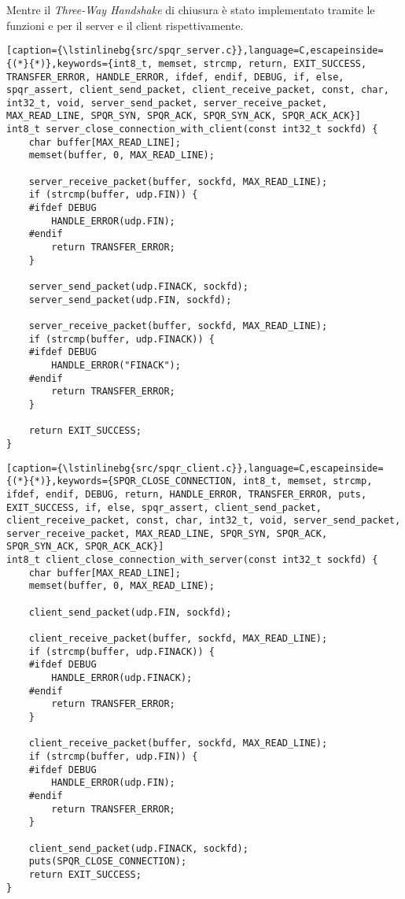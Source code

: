 Mentre il \textit{Three-Way Handshake} di chiusura è stato implementato tramite le funzioni  e  per il server e il client rispettivamente.

\begin{lstlisting}[caption={\lstinlinebg{src/spqr_server.c}},language=C,escapeinside={(*}{*)},keywords={int8_t, memset, strcmp, return, EXIT_SUCCESS, TRANSFER_ERROR, HANDLE_ERROR, ifdef, endif, DEBUG, if, else, spqr_assert, client_send_packet, client_receive_packet, const, char, int32_t, void, server_send_packet, server_receive_packet, MAX_READ_LINE, SPQR_SYN, SPQR_ACK, SPQR_SYN_ACK, SPQR_ACK_ACK}]
int8_t server_close_connection_with_client(const int32_t sockfd) {
    char buffer[MAX_READ_LINE];
    memset(buffer, 0, MAX_READ_LINE);

    server_receive_packet(buffer, sockfd, MAX_READ_LINE);
    if (strcmp(buffer, udp.FIN)) {
    #ifdef DEBUG
        HANDLE_ERROR(udp.FIN);
    #endif
        return TRANSFER_ERROR;
    }
    
    server_send_packet(udp.FINACK, sockfd);
    server_send_packet(udp.FIN, sockfd);
    
    server_receive_packet(buffer, sockfd, MAX_READ_LINE);
    if (strcmp(buffer, udp.FINACK)) {
    #ifdef DEBUG
        HANDLE_ERROR("FINACK");
    #endif
        return TRANSFER_ERROR;
    }

    return EXIT_SUCCESS;
}
\end{lstlisting}

\begin{lstlisting}[caption={\lstinlinebg{src/spqr_client.c}},language=C,escapeinside={(*}{*)},keywords={SPQR_CLOSE_CONNECTION, int8_t, memset, strcmp, ifdef, endif, DEBUG, return, HANDLE_ERROR, TRANSFER_ERROR, puts, EXIT_SUCCESS, if, else, spqr_assert, client_send_packet, client_receive_packet, const, char, int32_t, void, server_send_packet, server_receive_packet, MAX_READ_LINE, SPQR_SYN, SPQR_ACK, SPQR_SYN_ACK, SPQR_ACK_ACK}]
int8_t client_close_connection_with_server(const int32_t sockfd) {
    char buffer[MAX_READ_LINE];
    memset(buffer, 0, MAX_READ_LINE);

    client_send_packet(udp.FIN, sockfd);

    client_receive_packet(buffer, sockfd, MAX_READ_LINE);
    if (strcmp(buffer, udp.FINACK)) {
    #ifdef DEBUG
        HANDLE_ERROR(udp.FINACK);
    #endif
        return TRANSFER_ERROR;
    }

    client_receive_packet(buffer, sockfd, MAX_READ_LINE);
    if (strcmp(buffer, udp.FIN)) {
    #ifdef DEBUG
        HANDLE_ERROR(udp.FIN);
    #endif
        return TRANSFER_ERROR;
    }
    
    client_send_packet(udp.FINACK, sockfd);
    puts(SPQR_CLOSE_CONNECTION);
    return EXIT_SUCCESS;
}
\end{lstlisting}

